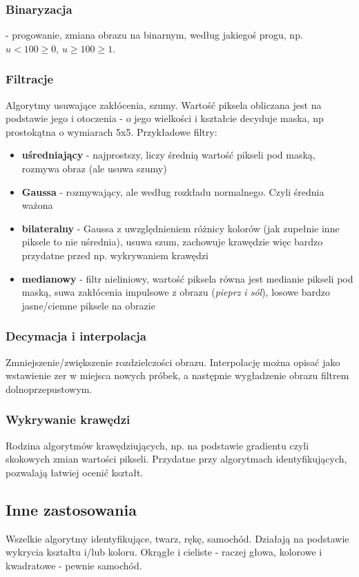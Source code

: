 \documentclass[a4paper,twoside]{report}
\begin{document}
\subsubsection{Binaryzacja} - progowanie, zmiana obrazu na binarnym, według jakiegoś progu, np. $u<100 \ge 0$, $u \ge 100 \ge 1$.


\subsubsection{Filtracje}
Algorytmy usuwające zakłócenia, szumy. Wartość piksela obliczana jest na podstawie jego i otoczenia - o jego wielkości i kształcie decyduje maska, np prostokątna o wymiarach 5x5. Przykładowe filtry:

\begin{itemize}
	\item \textbf{uśredniający} - najprostszy, liczy średnią wartość pikseli pod maską, rozmywa obraz (ale usuwa szumy)
	\item \textbf{Gaussa} - rozmywający, ale według rozkładu normalnego. Czyli średnia ważona
	\item \textbf{bilateralny} - Gaussa z uwzględnieniem różnicy kolorów (jak zupełnie inne piksele to nie uśrednia), usuwa szum, zachowuje krawędzie więc bardzo przydatne przed np. wykrywaniem krawędzi 
	\item \textbf{medianowy} - filtr nieliniowy, wartość piksela równa jest medianie pikseli pod maską, suwa zakłócenia impulsowe z obrazu (\textit{pieprz i sól}), losowe bardzo jasne/ciemne piksele na obrazie
\end{itemize}

\subsubsection{Decymacja i interpolacja}
Zmniejszenie/zwiększenie rozdzielczości obrazu. Interpolację można opisać jako wstawienie zer w miejsca nowych próbek, a następnie wygładzenie obrazu filtrem dolnoprzepustowym.

\subsubsection{Wykrywanie krawędzi}
Rodzina algorytmów krawędziujących, np. na podstawie gradientu czyli skokowych zmian wartości pikseli. Przydatne przy algorytmach identyfikujących, pozwalają łatwiej ocenić kształt.

\subsection{Inne zastosowania}
Wszelkie algorytmy identyfikujące, twarz, rękę, samochód. Działają na podstawie wykrycia kształtu i/lub koloru. Okrągłe i cieliste - raczej głowa, kolorowe i kwadratowe - pewnie samochód. 
\end{document}
